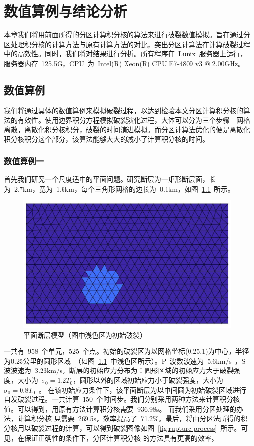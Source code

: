 
\chapter{数值算例与结论分析}
    \indent 本章我们将用前面所得的分区计算积分核的算法来进行破裂数值模拟。旨在通过分区处理积分核的计算方法与原有计算方法的对比，突出分区计算法在计算破裂过程中的高效性。同时，我们将对结果进行分析。所有程序在~Lunix~服务器上运行，服务器内存~125.5G，CPU~为~Intel(R) Xeon(R) CPU E7-4809 v3 @ 2.00GHz。
	\section{数值算例}
    \indent 我们将通过具体的数值算例来模拟破裂过程，以达到检验本文分区计算积分核的算法的有效性。使用边界积分方程模拟破裂演化过程，大体可以分为三个步骤：网格离散，离散化积分核积分，破裂的时间演进模拟。而分区计算法优化的便是离散化积分核积分这个部分，该算法能够大大的减小了计算积分核的时间。

		\subsection{数值算例一}
    \indent 首先我们研究一个尺度适中的平面问题。研究断层为一矩形断层面，长为~2.7km，宽为~1.6km，每个三角形网格的边长为~0.1km，如图~\ref{fig:rupture-model1}~所示。
 \begin{figure}[H]
    \centerin
   \includegraphics[trim = 0mm 40mm 80mm 40mm, clip=true,width=0.8\linewidth]{img/ruptuerprocess_step1.eps}
    \caption{ 平面断层模型（图中浅色区为初始破裂）} \label{fig:rupture-model1}
  \end{figure}
    \noindent 一共有~958~个单元，525~个点。初始的破裂区为以网格坐标(0.25,1)为中心，半径为0.25公里的圆形区域~（如图~\ref{fig:rupture-model1}~中浅色区所示）。P~波数波速为~5.6km/s~，S波波速为~3.23km/s。断层的初始应力分布为：圆形区域的初始应力大于破裂强度，大小为~$\sigma_{0} = 1.2 T_0$，圆形以外的区域初始应力小于破裂强度，大小为~$\sigma_{0}=0.8T_{0}$~。 在该初始应力条件下，该平面断层为以中间圆为初始破裂区域进行自发破裂过程。一共计算~150~个时间步。我们分别采用两种方法来计算积分核值。可以得到，用原有方法计算积分核需要~936.98s。 而我们采用分区处理的办法，计算积分核 只需要~269.5s，效率提高了~71.2\%。最后，将由分区法所得的积分核用以破裂过程的计算，可以得到破裂图像如图~\ref{fig:rupture-process}~所示。可见，在保证正确性的条件下，分区计算积分核 的方法具有更高的效率。
    
